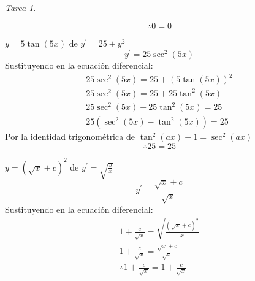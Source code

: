 \documentclass[12pt]{article} %
\theoremstyle{remark} %
\newtheorem{tarea}{Tarea}[section] %
\newcounter{ejercicio}[tarea]
\newcommand{\ed}{ecuación diferencial}
\begin{document}
\begin{tarea}
\begin{ejercicio}[7]
    \[ \therefore 0 = 0 \]
  \end{ejercicio}
  \begin{ejercicio}[9]
    $y = 5 \tan(5x)$ de $y^{\prime} = 25 + y^2$
    \[ y^{\prime} = 25 \sec^2(5x) \]
    Sustituyendo en la \ed :
    \begin{gather*}
      25 \sec^2(5x) = 25 + (5 \tan(5x))^2\\
      25 \sec^2(5x) = 25 + 25 \tan^2(5x)\\
      25 \sec^2(5x) - 25 \tan^2(5x) = 25\\
      25(\sec^2(5x) - \tan^2(5x)) = 25
    \end{gather*}
    Por la identidad trigonométrica de $\tan^2(ax) + 1 = \sec^2(ax)$
    \[ \therefore 25 = 25 \]
  \end{ejercicio}
  \begin{ejercicio}[10]
    $y = (\sqrt{x} + c)^2$ de $y^{\prime} = \sqrt{\frac{y}{x}}$
    \[ y^{\prime} = \frac{\sqrt{x} + c}{\sqrt{x}} \]
    Sustituyendo en la \ed :
    \begin{gather*}
      1 + \frac{c}{\sqrt{x}} = \sqrt{\frac{(\sqrt{x}+c)^2}{x}}\\
      1 + \frac{c}{\sqrt{x}} = \frac{\sqrt{x} + c}{\sqrt{x}}\\
      \therefore 1 + \frac{c}{\sqrt{x}} = 1 + \frac{c}{\sqrt{x}}
    \end{gather*}
  \end{ejercicio}
\end{tarea}
\end{document}
